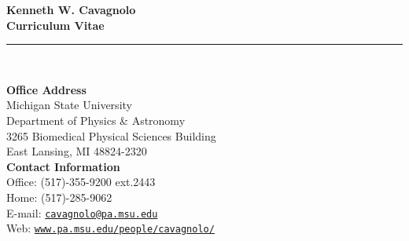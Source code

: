 \documentclass[12pt]{cv}
\begin{document}
\begin{center}
{\huge \textbf{\sc Kenneth W. Cavagnolo\\ \large Curriculum Vitae}}\\
\rule{17.35cm}{1pt}\\
\end{center}
\normalsize

\addresses
{
{\bf Office Address}\\
Michigan State University\\
Department of Physics \& Astronomy\\
3265 Biomedical Physical Sciences Building\\
East Lansing, MI 48824-2320\\
}
{
{\bf Contact Information}\\
Office: (517)-355-9200 ext.2443\\
Home: (517)-285-9062\\
E-mail: \href{mailto:cavagnolo@pa.msu.edu}{\tt{cavagnolo@pa.msu.edu}}\\
Web: \href{http://www.pa.msu.edu/people/cavagnolo/}{\tt www.pa.msu.edu/people/cavagnolo/}\\
}
\end{document}
